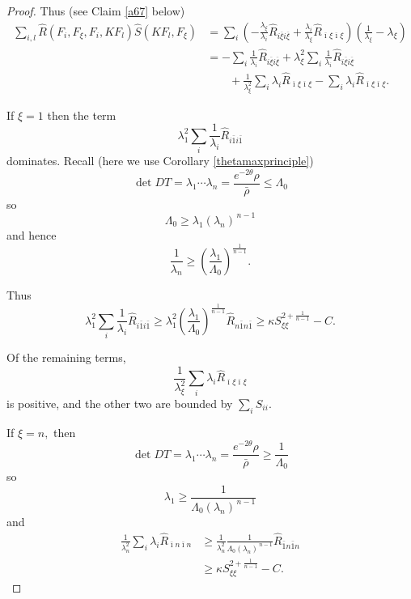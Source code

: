 \documentclass[12pt,letterpaper]{amsart}%
\numberwithin{mycounter}{section}
\theoremstyle{plain}
\numberwithin{equation}{section}
\theoremstyle{definition}
\newcommand{\maxidx}{\mathord{\xi}} %
\begin{document}
\begin{proof}
Thus (see Claim \ref{a67} below) 
\begin{align*}
\sum_{i,l}\hat{R}(F_{i},F_{\maxidx},F_{i},KF_{l})\hat{S}(KF_{l},F_{\maxidx})
&=\sum_{i}\left(
  -\frac{\lambda_{\maxidx}}{\lambda_{i}}\hat{R}_{i\overline{\maxidx}i\overline{\maxidx}}
  +\frac{\lambda_{i}}{\lambda_{\maxidx}}\hat{R}_{\overline{\imath}\maxidx\overline{\imath}\maxidx}
\right)
\left(  \frac{1}{\lambda_{\maxidx}}-\lambda_{\maxidx}\right)  \\
&=-\sum_{i}\frac{1}{\lambda_{i}}\hat{R}_{i\overline{\maxidx}i\overline{\maxidx}}
  +\lambda_{\maxidx}^{2}\sum_{i}\frac{1}{\lambda_{i}}\hat{R}_{i\overline{\maxidx}i\overline{\maxidx}}\\
&\qquad+\frac{1}{\lambda_{\maxidx}^{2}}\sum_{i}\lambda_{i}\hat{R}_{\overline{\imath}%
\maxidx\overline{\imath}\maxidx}-\sum_{i}\lambda_{i}\hat{R}_{\overline{\imath}\maxidx\overline{\imath}\maxidx}.
\end{align*}

If $\maxidx=1$ then the term
\[
\lambda_{1}^{2} \sum_{i}\frac{1}{\lambda_{i}}\hat{R}_{i\bar{1}i\bar{1}}
\]
dominates. Recall (here we use Corollary \ref{thetamaxprinciple}) 
\[
\det DT=\lambda_{1}\cdots\lambda_{n}
=\frac{e^{-2\theta}\rho}{\bar{\rho}}
\leq\Lambda_{0}
\]
so
\[
\Lambda_{0}\geq\lambda_{1}(\lambda_{n})^{\,n-1}
\]
and hence
\[
\frac{1}{\lambda_{n}}
\geq\left(  \frac{\lambda_{1}}{\Lambda_{0}}\right)^{\!\frac{1}{n-1}}.
\]

Thus
\[
\lambda_{1}^{2}\sum_{i}\frac{1}{\lambda_{i}}\hat{R}_{i\bar{1}i\bar{1}}
\geq
\lambda_{1}^{2}\left(  \frac{\lambda_{1}}{\Lambda_{0}}\right)^{\!\frac{1}{n-1}}
\hat{R}_{n\bar{1}n\bar{1}}
\geq
\kappa S_{\maxidx\maxidx}^{2+\frac{1}{n-1}}-C.
\]

Of the remaining terms,
\[
\frac{1}{\lambda_{\maxidx}^{2}}\sum_{i}\lambda_{i}\hat{R}_{\overline{\imath}\maxidx\overline{\imath}\maxidx}
\]
is positive, and the other two are bounded by $\sum_{i}S_{ii}.$

If $\maxidx=n,$ then
\[
\det DT=\lambda_{1}\cdots\lambda_{n}
=\frac{e^{-2\theta}\rho}{\bar{\rho}}
\geq\frac{1}{\Lambda_{0}}
\]
so
\[
\lambda_{1}\geq
\frac{1}{\Lambda_{0}(\lambda_{n})^{\,n-1}}
\]
and
\begin{align*}
\frac{1}{\lambda_{n}^{2}}\sum_{i}\lambda_{i}\hat{R}_{\bar{\imath}n\bar{\imath}n}
&\geq
\frac{1}{\lambda_{n}^{2}}
\frac{1}{\Lambda_{0}(\lambda_{n})^{\,n-1}}
\hat{R}_{\bar{1}n\bar{1}n}\\
&\geq
\kappa S_{\maxidx\maxidx}^{2+\frac{1}{n-1}}-C.
\end{align*}

\end{proof}
\end{document}
